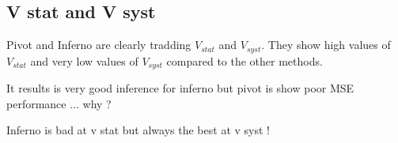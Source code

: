 



\subsection{V stat and V syst} %
\label{sub:v_stat_and_v_syst}

Pivot and Inferno are clearly tradding $V_{stat}$ and $V_{syst}$.
They show high values of $V_{stat}$ and very low values of $V_{syst}$ compared to the other methods.

It results is very good inference for inferno but pivot is show poor MSE performance ... why ?



Inferno is bad at v stat but always the best at v syst !



